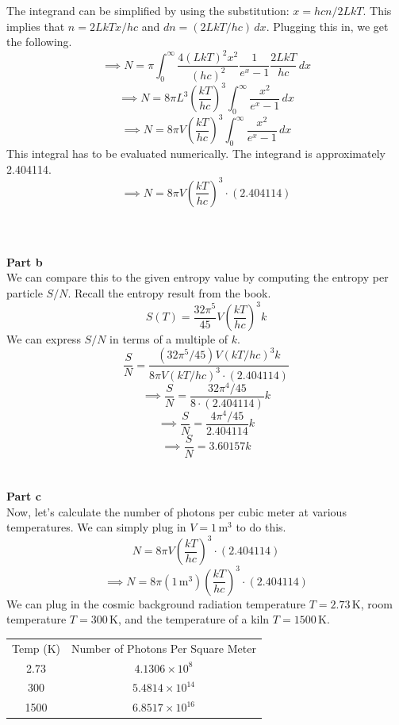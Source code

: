 \documentclass[12pt]{article}
\begin{document}
\begin{flushleft}
The integrand can be simplified by using the substitution: $x=hcn/2LkT$.
This implies that $n=2LkTx/hc$ and $dn=(2LkT/hc)\,dx$.
Plugging this in, we get the following.
$$\implies N=\pi\int_0^\infty\frac{4(LkT)^2x^2}{(hc)^2}\frac{1}{e^{x}-1}\frac{2LkT}{hc}\,dx$$
$$\implies N=8\pi L^3\left(\frac{kT}{hc}\right)^3\int_0^\infty\frac{x^2}{e^{x}-1}\,dx$$
$$\implies N=8\pi V\left(\frac{kT}{hc}\right)^3\int_0^\infty\frac{x^2}{e^{x}-1}\,dx$$
This integral has to be evaluated numerically.
The integrand is approximately 2.404114.
$$\implies N=8\pi V\left(\frac{kT}{hc}\right)^3\cdot(2.404114)$$\\~\\~\\


\textbf{Part b}\\
We can compare this to the given entropy value by computing the entropy per particle $S/N$.
Recall the entropy result from the book.
\begin{equation}
    S(T)=\frac{32\pi^5}{45}V\left(\frac{kT}{hc}\right)^3k
\end{equation}
We can express $S/N$ in terms of a multiple of $k$.
$$\frac{S}{N}=\frac{(32\pi^5/45)V(kT/hc)^3k}{8\pi V(kT/hc)^3\cdot(2.404114)}$$
$$\implies\frac{S}{N}=\frac{32\pi^4/45}{8\cdot(2.404114)}k$$
$$\implies\frac{S}{N}=\frac{4\pi^4/45}{2.404114}k$$
$$\implies\frac{S}{N}=3.60157k$$\\~\\


\textbf{Part c}\\
Now, let's calculate the number of photons per cubic meter at various temperatures.
We can simply plug in $V=1\,\text{m}^3$ to do this.
$$N=8\pi V\left(\frac{kT}{hc}\right)^3\cdot(2.404114)$$
$$\implies N=8\pi (1\,\text{m}^3)\left(\frac{kT}{hc}\right)^3\cdot(2.404114)$$
We can plug in the cosmic background radiation temperature $T=2.73\,\text{K}$, room temperature $T=300\,\text{K}$, and the temperature of a kiln $T=1500\,\text{K}$.\\
\begin{table}[h]
\begin{center}
\begin{tabular}{ |c|c| }
    \hline
    Temp (K) & Number of Photons Per Square Meter\\
    2.73 & $4.1306\times10^{8 }$ \\
    300  & $5.4814\times10^{14}$ \\
    1500 & $6.8517\times10^{16}$ \\
    \hline
\end{tabular}
\end{center}
\end{table}



\end{flushleft}
\end{document}
